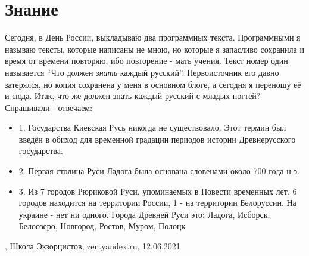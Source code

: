  
 
 
 
 
\chapter{Знание}
\label{sec:slova.znanie}

Сегодня, в День России, выкладываю два программных текста. Программными я
называю тексты, которые написаны не мною, но которые я запасливо сохранила и
время от времени повторяю, ибо повторение - мать учения. Текст номер один
называется \enquote{Что должен \emph{знать} каждый русский}. Первоисточник его давно
затерялся, но копия сохранена у меня в основном блоге, а сегодня я переношу её
и сюда. Итак, что же должен знать каждый русский с младых ногтей? Спрашивали -
отвечаем:
\begin{itemize}
  \item 1. Государства Киевская Русь никогда не существовало. Этот термин был введён в обиход для временной градации периодов истории Древнерусского государства.
  \item 2. Первая столица Руси Ладога была основана словенами около 700 года н э.
	\item 3. Из 7 городов Рюриковой Руси, упоминаемых в Повести временных лет, 6
					городов находится на территории России, 1 - на территории Белоруссии.
								На украине - нет ни одного. Города Древней Руси это: Ладога,
								Исборск, Белоозеро, Новгород, Ростов, Муром, Полоцк
\end{itemize}
, 
Школа Экзорцистов, zen.yandex.ru, 12.06.2021

